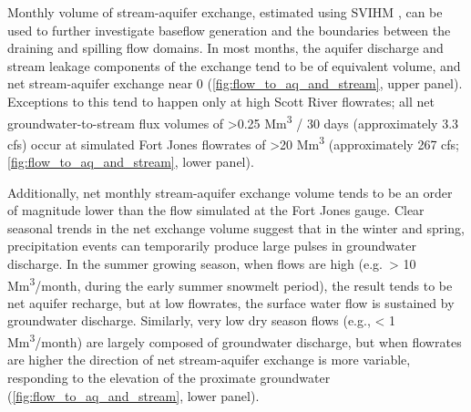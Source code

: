\documentclass[hess, manuscript]{copernicus}
\begin{document}
Monthly volume of stream-aquifer exchange, estimated using SVIHM
\citep{Tolley2019}, can be used to further investigate baseflow
generation and the boundaries between the draining and spilling flow
domains. In most months, the aquifer discharge and stream leakage
components of the exchange tend to be of equivalent volume, and net
stream-aquifer exchange near 0 (\autoref{fig:flow_to_aq_and_stream},
upper panel). Exceptions to this tend to happen only at high Scott River
flowrates; all net groundwater-to-stream flux volumes of
\textgreater0.25 Mm\textsuperscript{3} / 30 days (approximately 3.3 cfs)
occur at simulated Fort Jones flowrates of \textgreater20
Mm\textsuperscript{3} (approximately 267 cfs;
\autoref{fig:flow_to_aq_and_stream}, lower panel).

Additionally, net monthly stream-aquifer exchange volume tends to be an
order of magnitude lower than the flow simulated at the Fort Jones
gauge. Clear seasonal trends in the net exchange volume suggest that in
the winter and spring, precipitation events can temporarily produce
large pulses in groundwater discharge. In the summer growing season,
when flows are high (e.g.~\textgreater{} 10 Mm\textsuperscript{3}/month,
during the early summer snowmelt period), the result tends to be net
aquifer recharge, but at low flowrates, the surface water flow is
sustained by groundwater discharge. Similarly, very low dry season flows
(e.g., \textless{} 1 Mm\textsuperscript{3}/month) are largely composed
of groundwater discharge, but when flowrates are higher the direction of
net stream-aquifer exchange is more variable, responding to the
elevation of the proximate groundwater
(\autoref{fig:flow_to_aq_and_stream}, lower panel).
\end{document}
